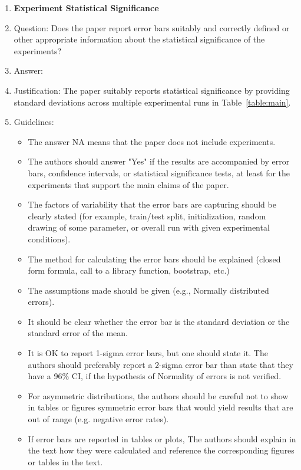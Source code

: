 \documentclass{article}
\begin{document}
\begin{enumerate}
\item {\bf Experiment Statistical Significance}
    \item[] Question: Does the paper report error bars suitably and correctly defined or other appropriate information about the statistical significance of the experiments?
    \item[] Answer: \answerYes{} %
    \item[] Justification: The paper suitably reports statistical significance by providing standard deviations across multiple experimental runs in Table~\ref{table:main}. 
    \item[] Guidelines:
    \begin{itemize}
        \item The answer NA means that the paper does not include experiments.
        \item The authors should answer "Yes" if the results are accompanied by error bars, confidence intervals, or statistical significance tests, at least for the experiments that support the main claims of the paper.
        \item The factors of variability that the error bars are capturing should be clearly stated (for example, train/test split, initialization, random drawing of some parameter, or overall run with given experimental conditions).
        \item The method for calculating the error bars should be explained (closed form formula, call to a library function, bootstrap, etc.)
        \item The assumptions made should be given (e.g., Normally distributed errors).
        \item It should be clear whether the error bar is the standard deviation or the standard error of the mean.
        \item It is OK to report 1-sigma error bars, but one should state it. The authors should preferably report a 2-sigma error bar than state that they have a 96\% CI, if the hypothesis of Normality of errors is not verified.
        \item For asymmetric distributions, the authors should be careful not to show in tables or figures symmetric error bars that would yield results that are out of range (e.g. negative error rates).
        \item If error bars are reported in tables or plots, The authors should explain in the text how they were calculated and reference the corresponding figures or tables in the text.
    \end{itemize}


\end{enumerate}
\end{document}
